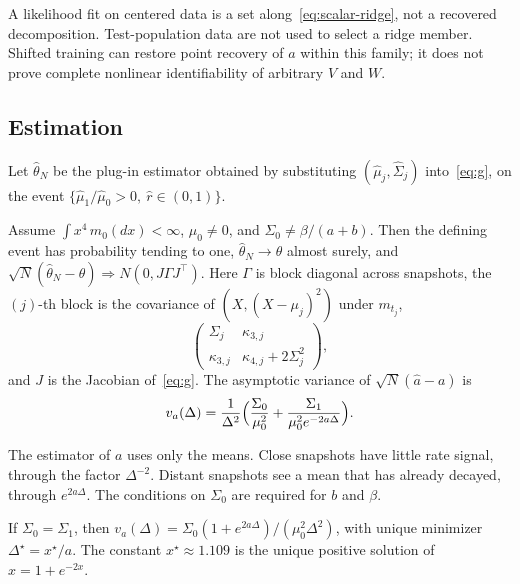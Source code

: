 \documentclass[anon,11pt]{alt2027}
\begin{document}
A likelihood fit on centered data is a set along~\eqref{eq:scalar-ridge}, not
a recovered decomposition. Test-population data are not used to select a
ridge member. Shifted training can restore point recovery of $a$ within this
family; it does not prove complete nonlinear identifiability of arbitrary
$V$ and $W$.

\subsection{Estimation}

Let $\hat\theta_N$ be the plug-in estimator obtained by substituting
$(\hat\mu_j,\hat\Sigma_j)$ into~\eqref{eq:g}, on the event
$\{\hat\mu_1/\hat\mu_0>0,\ \hat r\in(0,1)\}$.

\begin{theorem}
\label{thm:est}
Assume $\int x^4\,m_0(dx)<\infty$, $\mu_0\neq 0$, and
$\Sigma_0\neq\beta/(a+b)$. Then the defining event has probability tending to
one, $\hat\theta_N\to\theta$ almost surely, and
$\sqrt N(\hat\theta_N-\theta)\Rightarrow N(0,J\Gamma J^\top)$.
Here $\Gamma$ is block diagonal across snapshots, the $(j)$-th block is the
covariance of $(X,(X-\mu_j)^2)$ under $m_{t_j}$,
\[
\begin{pmatrix}
\Sigma_j & \kappa_{3,j}\\
\kappa_{3,j} & \kappa_{4,j}+2\Sigma_j^2
\end{pmatrix},
\]
and $J$ is the Jacobian of~\eqref{eq:g}. The asymptotic variance of
$\sqrt N(\hat a-a)$ is
\begin{equation}
\label{eq:avar}
v_a(\Delta)
=
\frac1{\Delta^2}
\Bigl(
\frac{\Sigma_0}{\mu_0^2}
+
\frac{\Sigma_1}{\mu_0^2 e^{-2a\Delta}}
\Bigr).
\end{equation}
\end{theorem}

The estimator of $a$ uses only the means. Close snapshots have little rate
signal, through the factor $\Delta^{-2}$. Distant snapshots see a mean that has
already decayed, through $e^{2a\Delta}$. The conditions on $\Sigma_0$ are
required for $b$ and $\beta$.

\begin{corollary}
\label{cor:spacing}
If $\Sigma_0=\Sigma_1$, then
$v_a(\Delta)=\Sigma_0(1+e^{2a\Delta})/(\mu_0^2\Delta^2)$, with unique minimizer
$\Delta^\star=x^\star/a$. The constant $x^\star\approx 1.109$ is the unique
positive solution of $x=1+e^{-2x}$.
\end{corollary}
\end{document}
